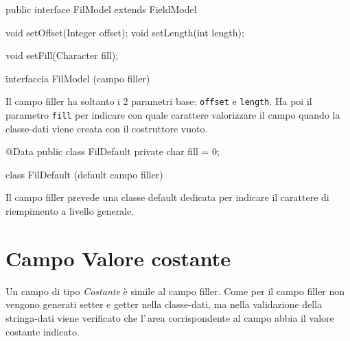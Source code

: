 \documentclass[a4paper,10pt]{report}
\newif\ifesource
\newenvironment{elisting}[1][H]
  {\captionsetup{aboveskip=0pt}\begin{listing}[#1]}
  {\end{listing}%
}
\begin{document}
\ifesource
\begin{figure*}[!htb]
\begin{lstlisting}[language=java, 
caption=interfaccia FilModel (campo filler), 
label=lst:FilModel]
public interface FilModel extends FieldModel {
    void setOffset(Integer offset);
    void setLength(int length);
    
    void setFill(Character fill);
}
\end{lstlisting}\index{FilModel}
\end{figure*}
\else
\begin{elisting}[!htb]
\begin{javacode}
public interface FilModel extends FieldModel {
    void setOffset(Integer offset);
    void setLength(int length);
    
    void setFill(Character fill);
}
\end{javacode}
\caption{interfaccia FilModel (campo filler)}
\label{lst:FilModel}
\end{elisting}
\fi

Il campo filler ha soltanto i 2 parametri base: \verb!offset! e \verb!length!.
Ha poi il parametro \verb!fill! per indicare con quale carattere valorizzare il
campo quando la classe-dati viene creata con il costruttore vuoto.

\ifesource
\begin{figure*}[!htb]
\begin{lstlisting}[language=java, 
caption=class FilDefault (default campo filler), 
label=lst:FilDefault]
@Data
public class FilDefault {
    private char fill = 0;
}
\end{lstlisting}\index{FilDefault}
\end{figure*}
\else
\begin{elisting}[!htb]
\begin{javacode}
@Data
public class FilDefault {
    private char fill = 0;
}
\end{javacode}
\caption{class FilDefault (default campo filler)}
\label{lst:FilDefault}
\end{elisting}
\fi

Il campo filler prevede una classe default dedicata per indicare il carattere di
riempimento a livello generale.

\section{Campo Valore costante}
Un campo di tipo \textsl{Costante} è simile al campo filler. Come per il campo
filler non vengono generati setter e getter nella classe-dati, ma nella 
validazione della stringa-dati viene verificato che l'\,area corrispondente al 
campo abbia il valore costante indicato.
\end{document}
